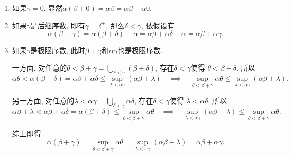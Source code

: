 \documentclass[UTF8]{ctexart}
\begin{document}
\begin{enumerate}
    \item 如果$\gamma=0$, 显然$\alpha(\beta+0)=\alpha\beta=\alpha\beta+\alpha0$.
    
    \vspace{3pt}
    \item 如果$\gamma$是后继序数, 即有$\gamma=\delta^+$, 那么$\delta<\gamma$,
    依假设有
    \[
        \alpha(\beta+\gamma)=\alpha(\beta+\delta)+\alpha=
        \alpha\beta+\alpha\delta+\alpha=\alpha\beta+\alpha\gamma.
    \]

    \vspace{3pt}
    \item 如果$\gamma$是极限序数, 此时$\beta+\gamma$和$\alpha\gamma$也是极限序数.
    
    \vspace{3pt}\hspace{2.17em}
    一方面, 对任意的$\displaystyle\theta<\beta+\gamma=
    \bigcup_{\delta<\gamma}(\beta+\delta)$, 存在$\delta<\gamma$使得
    $\theta<\beta+\delta$, 所以
    \vspace{3pt}
    \[
        \alpha\theta<\alpha(\beta+\delta)=\alpha\beta+\alpha\delta
        \leqslant\sup_{\lambda<\alpha\gamma}(\alpha\beta+\lambda)
        \quad\implies\quad\sup_{\theta<\beta+\gamma}\alpha\theta
        \leqslant\sup_{\lambda<\alpha\gamma}(\alpha\beta+\lambda).
    \]

    \vspace{3pt}\hspace{2.17em}
    另一方面, 对任意的$\displaystyle\lambda<\alpha\gamma=
    \bigcup_{\delta<\gamma}\alpha\delta$, 存在$\delta<\gamma$使得
    $\lambda<\alpha\delta$, 所以
    \vspace{3pt}
    \[
        \alpha\beta+\lambda<\alpha\beta+\alpha\delta=\alpha(\beta+\delta)
        \leqslant\sup_{\theta<\beta+\gamma}\alpha\theta
        \quad\implies\quad\sup_{\lambda<\alpha\gamma}(\alpha\beta+\lambda)
        \leqslant\sup_{\theta<\beta+\gamma}\alpha\theta.
    \]

    \hspace{2.17em}
    综上即得
    \begin{equation*}
        \alpha(\beta+\gamma)=\sup_{\theta<\beta+\gamma}\alpha\theta=
        \sup_{\lambda<\alpha\gamma}(\alpha\beta+\lambda)=
        \alpha\beta+\alpha\gamma.
    \tag*{\qedsymbol}\end{equation*}
\end{enumerate}

\vspace{10pt}
\end{document}
